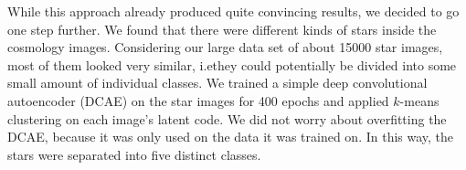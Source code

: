 \documentclass[10pt,conference,compsocconf]{IEEEtran}
\begin{document}
While this approach already produced quite convincing results, we decided to go one step further. We found that there were different kinds of stars inside the cosmology images. Considering our large data set of about \SI{15000}{} star images, most of them looked very similar, i.e\@ they could potentially be divided into some small amount of individual classes. We trained a simple deep convolutional autoencoder (DCAE) on the star images for 400 epochs and applied $k$-means clustering on each image's latent code. We did not worry about overfitting the DCAE, because it was only used on the data it was trained on. In this way, the stars were separated into five distinct classes. 


\end{document}
